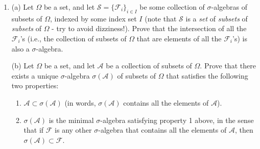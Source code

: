 \documentclass[11pt]{report}
\providecommand{\cal}{\mathcal}
\theoremstyle{plain}
\theoremstyle{definition}
\begin{document}
\begin{enumerate}[label=\arabic*.]
is true. You may submit a short written explanation to test your understanding, but it is not required.

(b) A group of $N$ prisoners is locked up in a prison, each in a separate cell with no ability to communicate with the other prisoners. Each cell contains a mysterious on/off electrical switch. One evening the warden visits each of the prisoners and presents them with the following dilemma: During the night each prisoner must choose whether to leave his switch in the on or off position. If at midnight \emph{exactly one} of the switches is in the on position, all the prisoners will be set free in the morning; otherwise they will all be executed!

The prisoners cannot coordinate their actions, but they are all rational, know calculus and probability theory, and each is equipped with a random number generator. Find the strategy that the prisoners will take to maximize their chance of survival, and compute what that chance is, as a function of $N$ and in the limit when $N$ is very large. For extra fun, try to guess in advance how big or small you expect the survival likelihood to be, and see how your guess measures up to the actual result.
\item (a) Let $\Omega$ be a set, and let ${\cal S} = \{{\cal F}_i\}_{i\in I}$ be some collection of $\sigma$-algebras of subsets of $\Omega$, indexed by some index set $I$ (note that ${\cal S}$ is a \emph{set} of \emph{subsets} of \emph{subsets} of $\Omega$ - try to avoid dizziness!). Prove that the intersection of all the ${\cal F}_i$'s (i.e., the collection of subsets of $\Omega$ that are elements of all the ${\cal F}_i$'s) is also a $\sigma$-algebra.

(b) Let $\Omega$ be a set, and let ${\cal A}$ be a collection of subsets of $\Omega$. Prove that there exists a unique $\sigma$-algebra $\sigma({\cal A})$ of subsets of $\Omega$ that satisfies the following two properties:

\begin{enumerate}[label=(\roman*)]
\item ${\cal A} \subset \sigma({\cal A})$ (in words, $\sigma({\cal A})$ contains all the elements of ${\cal A}$).
\item $\sigma({\cal A})$ is the minimal $\sigma$-algebra satisfying property 1 above, in the sense that if ${\cal F}$ is any other $\sigma$-algebra that contains all the elements of ${\cal A}$, then $\sigma({\cal A}) \subset {\cal F}$.
\end{enumerate}


\end{enumerate}
\end{document}
